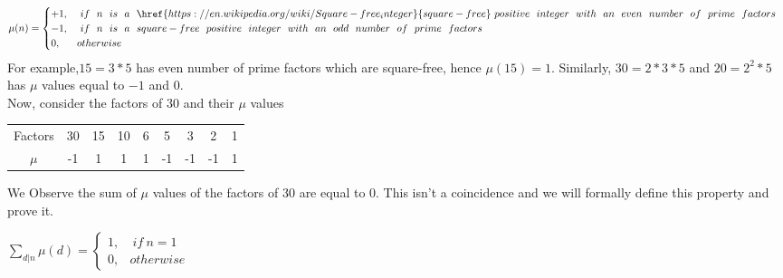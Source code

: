 	\[
	\mu(n) = \begin{cases} 
	+1 , & ~if~ ~n~ ~is~ ~a~ ~\href{https://en.wikipedia.org/wiki/Square-free_integer}{square-free} ~positive~ ~integer~ ~with~ ~an~ ~even~ ~number~ ~of~ ~prime~ ~factors~~\\
 	-1 , & ~if~ ~n~ ~is~ ~a~ ~square-free~ ~positive~ ~integer~ ~with~ ~an~ ~odd~ ~number~ ~of~ ~prime~ ~factors~~\\
	0 , & otherwise
	\end{cases}
	\]
\noindent
For example,$15=3*5$ has even number of prime factors which are square-free, hence $\mu(15)=1$. Similarly, $30=2*3*5$ and $20={2^2}*5$ has $\mu$ values equal to $-1$ and $0$. \\
Now, consider the factors of $30$ and their $\mu$ values
\begin{center}
\begin{tabular}{c c c c c c c c c }
 Factors & 30 & 15 & 10 & 6 & 5 & 3 & 2 & 1 \\ 
 $\mu$ & -1 & 1 & 1 & 1 & -1 & -1 & -1 & 1 \\  
\end{tabular}
\end{center}
\noindent
We Observe the sum of $\mu$ values of the factors of $30$ are equal to $0$. This isn't a coincidence and we will formally define this property and prove it.\\

\begin{property} \label{prp:2}
$\sum_{d|n}\mu(d) = \begin{cases} \label{subsec: Properties of Möbius Function }
	1 , & ~if~ n=1\\
	0 , & otherwise
	\end{cases}
	$
\end{property}

